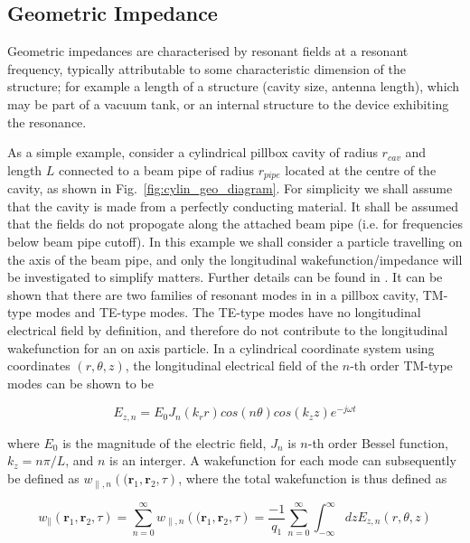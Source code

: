 \subsection{Geometric Impedance}
\label{sec:imp_geo_imp}

Geometric impedances are characterised by resonant fields at a resonant frequency, typically attributable to some characteristic dimension of the structure; for example a length of a structure (cavity size, antenna length), which may be part of a vacuum tank, or an internal structure to the device exhibiting the resonance. 

As a simple example, consider a cylindrical pillbox cavity of radius $r_{cav}$ and length $L$ connected to a beam pipe of radius $r_{pipe}$ located at the centre of the cavity, as shown in Fig.~\ref{fig:cylin_geo_diagram}. For simplicity we shall assume that the cavity is made from a perfectly conducting material. It shall be assumed that the fields do not propogate along the attached beam pipe (i.e. for frequencies below beam pipe cutoff). In this example we shall consider a particle travelling on the axis of the beam pipe, and only the longitudinal wakefunction/impedance will be investigated to simplify matters. Further details can be found in \cite{Wolsky:TheoryEM, Jensen:RFCav, Stupakov:wakeAndImp}. It can be shown that there are two families of resonant modes in in a pillbox cavity, TM-type modes and TE-type modes. The TE-type modes have no longitudinal electrical field by definition, and therefore do not contribute to the longitudinal wakefunction for an on axis particle. In a cylindrical coordinate system using coordinates $(r, \theta, z)$, the longitudinal electrical field of the $n$-th order TM-type modes can be shown to be

\begin{equation}
E_{z,n} = E_{0}J_{n}\left( k_{r} r \right) cos \left( n \theta \right) cos \left( k_{z} z \right) e^{-j \omega t}
\end{equation}

where $E_{0}$ is the magnitude of the electric field, $J_{n}$ is $n$-th order Bessel function, $k_{z}=n\pi{}/L$, and $n$ is an interger. A wakefunction for each mode can subsequently be defined as $w_{\parallel ,n}\left(( \mathbf{r}_{1}, \mathbf{r}_{2}, \tau \right)$, where the total wakefunction is thus defined as

\begin{equation}
w_{\parallel} \left( \mathbf{r}_{1}, \mathbf{r}_{2}, \tau \right) =  \displaystyle\sum\limits_{n = 0}^{\infty} w_{\parallel ,n} \left(( \mathbf{r}_{1}, \mathbf{r}_{2}, \tau \right) = \frac{-1}{q_{1}}\displaystyle\sum\limits_{n = 0}^{\infty} \int^{\infty}_{-\infty} dz E_{z,n} \left( r, \theta , z \right)
\end{equation}

